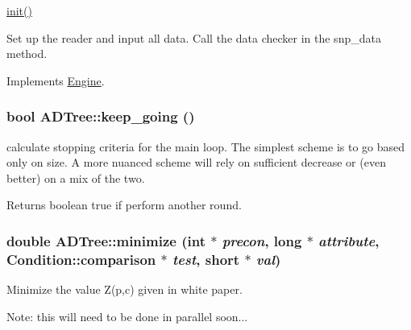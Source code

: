 \hyperlink{classADTree_a70b34e300c187fb817bc6d8ba31aceaa}{init()}

Set up the reader and input all data. Call the data checker in the snp\_\-data method. 

Implements \hyperlink{classEngine_aaa054d596fb8ced6e3eb4bee208f8c3d}{Engine}.

\hypertarget{classADTree_af693c7a7151e15c4c14af80a06fc971c}{
\subsubsection[{keep\_\-going}]{\setlength{\rightskip}{0pt plus 5cm}bool ADTree::keep\_\-going ()}}
\label{classADTree_af693c7a7151e15c4c14af80a06fc971c}
calculate stopping criteria for the main loop. The simplest scheme is to go based only on size. A more nuanced scheme will rely on sufficient decrease or (even better) on a mix of the two. \begin{DoxyReturn}{Returns}
boolean true if perform another round. 
\end{DoxyReturn}
\hypertarget{classADTree_a9afd1374b2b77b24cd766be6f4450db7}{
\subsubsection[{minimize}]{\setlength{\rightskip}{0pt plus 5cm}double ADTree::minimize (int $\ast$ {\em precon}, \/  long $\ast$ {\em attribute}, \/  {\bf Condition::comparison} $\ast$ {\em test}, \/  short $\ast$ {\em val})}}
\label{classADTree_a9afd1374b2b77b24cd766be6f4450db7}
Minimize the value Z(p,c) given in white paper.

Note: this will need to be done in parallel soon...

